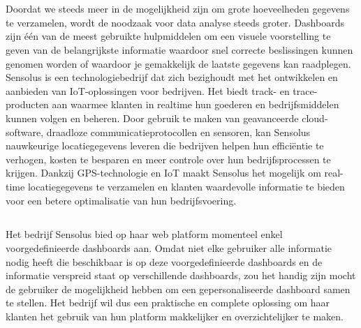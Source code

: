 
\chapter{}%
\label{ch:inleiding}

Doordat we steeds meer in de mogelijkheid zijn om grote hoeveelheden gegevens te verzamelen, wordt de noodzaak voor data analyse steeds groter. Dashboards zijn één van de meest gebruikte hulpmiddelen om een visuele voorstelling te geven van de belangrijkste informatie waardoor snel  correcte beslissingen kunnen genomen worden of waardoor je gemakkelijk de laatste gegevens kan raadplegen. 
Sensolus is een technologiebedrijf dat zich bezighoudt met het ontwikkelen en aanbieden van IoT-oplossingen voor bedrijven. Het biedt track- en trace-producten aan waarmee klanten in realtime hun goederen en bedrijfsmiddelen kunnen volgen en beheren. Door gebruik te maken van geavanceerde cloud-software, draadloze communicatieprotocollen en sensoren, kan Sensolus nauwkeurige locatiegegevens leveren die bedrijven helpen hun efficiëntie te verhogen, kosten te besparen en meer controle over hun bedrijfsprocessen te krijgen. Dankzij GPS-technologie en IoT maakt Sensolus het mogelijk om real-time locatiegegevens te verzamelen en klanten waardevolle informatie te bieden voor een betere optimalisatie van hun bedrijfsvoering.  

\section{}%
\label{sec:probleemstelling}

Het bedrijf Sensolus bied op haar web platform momenteel enkel voorgedefinieerde dashboards aan. Omdat niet elke gebruiker alle informatie nodig heeft die beschikbaar is op deze voorgedefinieerde dashboards en de informatie verspreid staat op verschillende dashboards, zou het handig zijn mocht de gebruiker de mogelijkheid hebben om een gepersonaliseerde dashboard samen te stellen. Het bedrijf wil dus een praktische en complete oplossing om haar klanten het gebruik van hun platform makkelijker en overzichtelijker te maken.

\section{}%
\label{sec:onderzoeksvraag}

